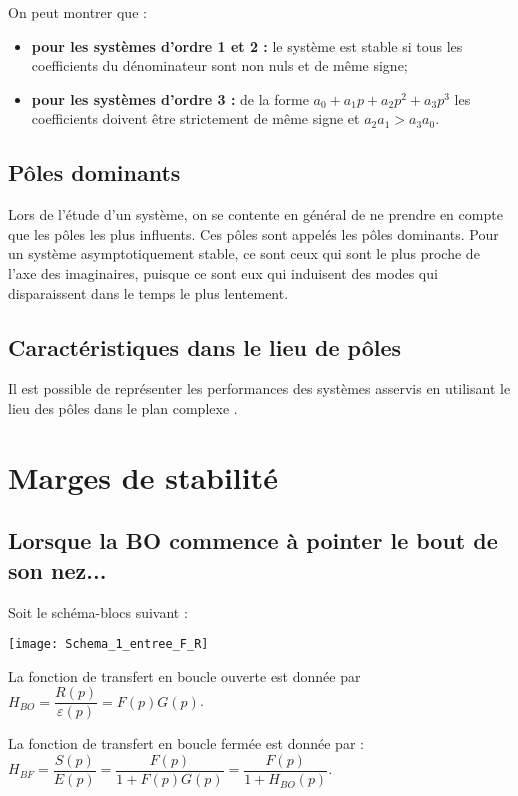 \begin{rem}On peut montrer que :
\begin{itemize}
\item \textbf{pour les systèmes d'ordre 1 et 2 :} le système est stable si tous les coefficients du dénominateur sont non nuls et de même signe;
\item \textbf{pour les systèmes d'ordre 3 :} de la forme $a_0+a_1p+a_2p^2+a_3p^3$ les coefficients doivent être strictement de même signe et $a_2 a_1 > a_3 a_0$.
\end{itemize}
\end{rem}

\subsection{Pôles dominants \cite{1}}
Lors de l’étude d’un système, on se contente en général de ne prendre en compte que les pôles les plus influents. Ces pôles sont appelés les pôles dominants. Pour un système asymptotiquement stable, ce sont ceux qui sont le plus proche de l’axe des imaginaires, puisque ce sont eux qui induisent des modes qui disparaissent dans le temps le plus lentement.

\subsection{Caractéristiques dans le lieu de pôles}
Il est possible de représenter les performances des systèmes asservis en utilisant le lieu des pôles dans le plan complexe \cite{1}. 

\section{Marges de stabilité}
\subsection{Lorsque la BO commence à pointer le bout de son nez...}


Soit le schéma-blocs suivant : 

\begin{center}
\texttt{[image: Schema\_1\_entree\_F\_R]}
\end{center}

La fonction de transfert en boucle ouverte est donnée par $H_{BO}=\dfrac{R(p)}{\varepsilon(p)}=F(p)G(p)$. 

La fonction de transfert en boucle fermée est donnée par : $H_{BF}=\dfrac{S(p)}{E(p)}=\dfrac{F(p)}{1+F(p)G(p)}=\dfrac{F(p)}{1+H_{BO}(p)}$. 

